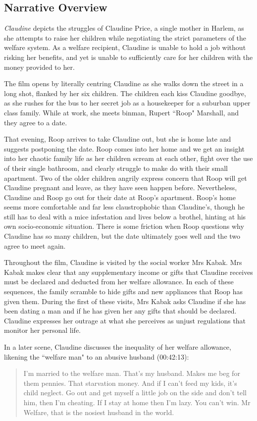 \subsection{Narrative Overview}

\textit{Claudine} depicts the struggles of Claudine Price, a single mother in Harlem, as she attempts to raise her children while negotiating the strict parameters of the welfare system.
As a welfare recipient, Claudine is unable to hold a job without risking her benefits, and yet is unable to sufficiently care for her children with the money provided to her.

The film opens by literally centring Claudine as she walks down the street in a long shot, flanked by her six children.
The children each kiss Claudine goodbye, as she rushes for the bus to her secret job as a housekeeper for a suburban upper class family.
While at work, she meets binman, Rupert ``Roop" Marshall, and they agree to a date.

That evening, Roop arrives to take Claudine out, but she is home late and suggests postponing the date.
Roop comes into her home and we get an insight into her chaotic family life as her children scream at each other, fight over the use of their single bathroom, and clearly struggle to make do with their small apartment.
Two of the older children angrily express concern that Roop will get Claudine pregnant and leave, as they have seen happen before.
Nevertheless, Claudine and Roop go out for their date at Roop's apartment.
Roop's home seems more comfortable and far less claustrophobic than Claudine's, though he still has to deal with a mice infestation and lives below a brothel, hinting at his own socio-economic situation.
There is some friction when Roop questions why Claudine has so many children, but the date ultimately goes well and the two agree to meet again. 

Throughout the film, Claudine is visited by the social worker Mrs Kabak.
Mrs Kabak makes clear that any supplementary income or gifts that Claudine receives must be declared and deducted from her welfare allowance.
In each of these sequences, the family scramble to hide gifts and new appliances that Roop has given them.
During the first of these visits, Mrs Kabak asks Claudine if she has been dating a man and if he has given her any gifts that should be declared.
Claudine expresses her outrage at what she perceives as unjust regulations that monitor her personal life.

In a later scene, Claudine discusses the inequality of her welfare allowance, likening the ``welfare man" to an abusive husband (00:42:13):
\begin{quote}
I'm married to the welfare man. That's my husband. Makes me beg for them pennies. That starvation money. And if I can't feed my kids, it's child neglect. Go out and get myself a little job on the side and don't tell him, then I'm cheating. If I stay at home then I'm lazy. You can't win. Mr Welfare, that is the nosiest husband in the world.
\end{quote}

